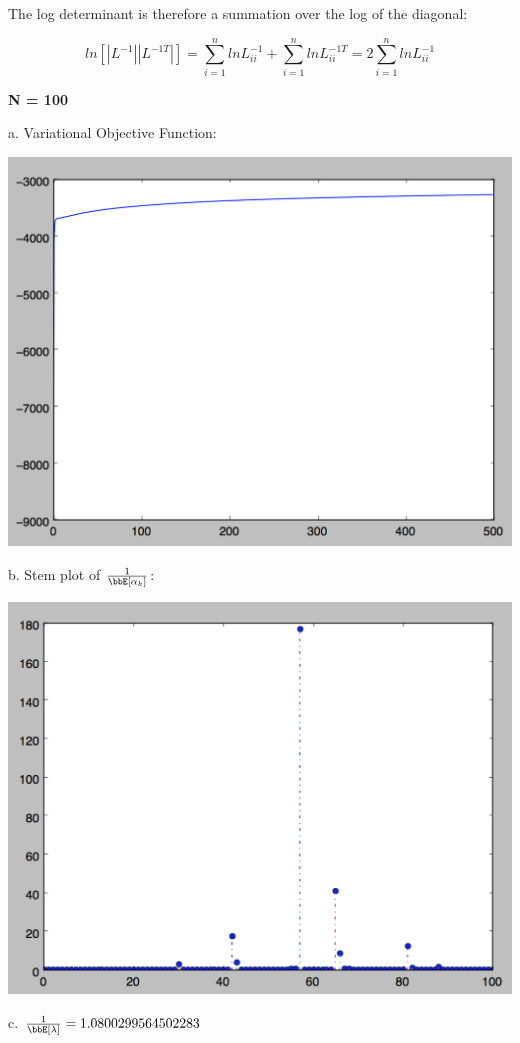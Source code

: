 \documentclass[twoside,11pt]{homework}
\begin{document}
The log determinant is therefore a summation over the log of the diagonal:

\[
ln[|L^{-1}||L^{-1T}|] = \sum_{i=1}^n lnL^{-1}_{ii}  +  \sum_{i=1}^n lnL^{-1T}_{ii} = 2\sum_{i=1}^n lnL^{-1}_{ii}
\]

\textbf{N = 100}

a. Variational Objective Function:

\includegraphics[scale=.5]{images/1objfunc.png}

b. Stem plot of $\frac{1}{\bbE[\alpha_k]}$:

\includegraphics[scale=.5]{images/1stem.png}

c. $\frac{1}{\bbE[\lambda]} = 1.0800299564502283$
\end{document}

